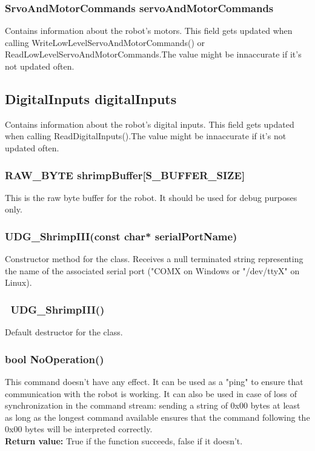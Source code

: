 \documentclass{book}
\begin{document}
\subsubsection{SrvoAndMotorCommands servoAndMotorCommands}
Contains information about the robot's motors. This field gets updated when calling WriteLowLevelServoAndMotorCommands() or ReadLowLevelServoAndMotorCommands.The value might be innaccurate if it's not updated often.\\

\subsection{DigitalInputs digitalInputs}
Contains information about the robot's digital inputs. This field gets updated when calling ReadDigitalInputs().The value might be innaccurate if it's not updated often.\\

\subsubsection{RAW\_BYTE shrimpBuffer[S\_BUFFER\_SIZE]}
This is the raw byte buffer for the robot. It should be used for debug purposes only.\\

\subsubsection{	UDG\_ShrimpIII(const char* serialPortName)}
Constructor method for the class. Receives a null terminated string representing the name of the associated serial port ("COMX on Windows or "/dev/ttyX" on Linux).\\

\subsubsection{~UDG\_ShrimpIII()}
Default destructor for the class.\\

\subsubsection{bool NoOperation()}
This command doesn't have any effect. It can be used as a "ping" to ensure that communication with the robot is working. It can also be used in case of loss of synchronization in the command stream: sending a string of 0x00 bytes at least as long as the longest command available ensures that the command following the 0x00 bytes will be interpreted correctly.\\
\textbf{Return value: }True if the function succeeds, false if it doesn't.\\ 
\end{document}
